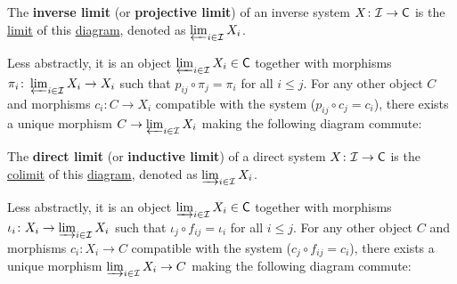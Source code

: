 \documentclass[../../main]{subfiles}
\begin{document}
\begin{definition}\label{def:inverse-limit}
  The \textbf{inverse limit} (or \textbf{projective limit}) of an inverse system \(X\colon \mathcal{I} \to \mathsf{C}\) is the \hyperref[def:categorical-limit]{limit} of this \hyperref[def:diagram]{diagram}, denoted as \(\varprojlim_{i \in \mathcal{I}} X_{i}\).
  
  Less abstractly, it is an object \(\varprojlim_{i \in \mathcal{I}} X_{i} \in \mathsf{C}\) together with morphisms \(\pi_{i}\colon \varprojlim_{i \in \mathcal{I}} X_{i} \to X_{i}\) such that \(p_{ij} \circ \pi_{j} = \pi_{i}\) for all \(i \leq j\). For any other object \(C\) and morphisms \(c_{i}\colon C \to X_{i}\) compatible with the system (\(p_{ij} \circ c_{j} = c_{i}\)), there exists a unique morphism \(C \to \varprojlim_{i \in \mathcal{I}} X_{i}\) making the following diagram commute:
  \begin{center}
  \end{center}
\end{definition}

\begin{definition}\label{def:direct-limit}
  The \textbf{direct limit} (or \textbf{inductive limit}) of a direct system \(X\colon \mathcal{I} \to \mathsf{C}\) is the \hyperref[def:categorical-colimit]{colimit} of this \hyperref[def:diagram]{diagram}, denoted as \(\varinjlim_{i \in \mathcal{I}} X_{i}\).
  
  Less abstractly, it is an object \(\varinjlim_{i \in \mathcal{I}} X_{i} \in \mathsf{C}\) together with morphisms \(\iota_{i}\colon X_{i} \to \varinjlim_{i \in \mathcal{I}} X_{i}\) such that \(\iota_{j} \circ f_{ij} = \iota_{i}\) for all \(i \leq j\). For any other object \(C\) and morphisms \(c_{i}\colon X_{i} \to C\) compatible with the system (\(c_{j} \circ f_{ij} = c_{i}\)), there exists a unique morphism \(\varinjlim_{i \in \mathcal{I}} X_{i} \to C\) making the following diagram commute:
  \begin{center}
  \end{center}
\end{definition}
\end{document}
